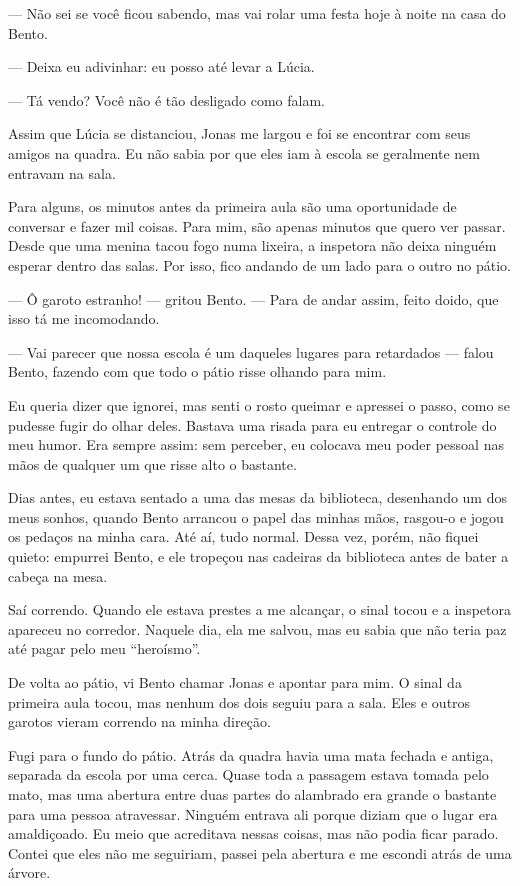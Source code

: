 — Não sei se você ficou sabendo, mas vai rolar uma festa hoje à noite na casa do Bento.

— Deixa eu adivinhar: eu posso até levar a Lúcia.

— Tá vendo? Você não é tão desligado como falam.

Assim que Lúcia se distanciou, Jonas me largou e foi se encontrar com seus amigos na quadra. Eu não sabia por que eles iam à escola se geralmente nem entravam na sala.

Para alguns, os minutos antes da primeira aula são uma oportunidade de conversar e fazer mil coisas. Para mim, são apenas minutos que quero ver passar. Desde que uma menina tacou fogo numa lixeira, a inspetora não deixa ninguém esperar dentro das salas. Por isso, fico andando de um lado para o outro no pátio.

— Ô garoto estranho! — gritou Bento. — Para de andar assim, feito doido, que isso tá me incomodando.

— Vai parecer que nossa escola é um daqueles lugares para retardados — falou Bento, fazendo com que todo o pátio risse olhando para mim.

Eu queria dizer que ignorei, mas senti o rosto queimar e apressei o passo, como se pudesse fugir do olhar deles. Bastava uma risada para eu entregar o controle do meu humor. Era sempre assim: sem perceber, eu colocava meu poder pessoal nas mãos de qualquer um que risse alto o bastante.

Dias antes, eu estava sentado a uma das mesas da biblioteca, desenhando um dos meus sonhos, quando Bento arrancou o papel das minhas mãos, rasgou-o e jogou os pedaços na minha cara. Até aí, tudo normal. Dessa vez, porém, não fiquei quieto: empurrei Bento, e ele tropeçou nas cadeiras da biblioteca antes de bater a cabeça na mesa.

Saí correndo. Quando ele estava prestes a me alcançar, o sinal tocou e a inspetora apareceu no corredor. Naquele dia, ela me salvou, mas eu sabia que não teria paz até pagar pelo meu “heroísmo”.

De volta ao pátio, vi Bento chamar Jonas e apontar para mim. O sinal da primeira aula tocou, mas nenhum dos dois seguiu para a sala. Eles e outros garotos vieram correndo na minha direção.

Fugi para o fundo do pátio. Atrás da quadra havia uma mata fechada e antiga, separada da escola por uma cerca. Quase toda a passagem estava tomada pelo mato, mas uma abertura entre duas partes do alambrado era grande o bastante para uma pessoa atravessar. Ninguém entrava ali porque diziam que o lugar era amaldiçoado. Eu meio que acreditava nessas coisas, mas não podia ficar parado. Contei que eles não me seguiriam, passei pela abertura e me escondi atrás de uma árvore.

